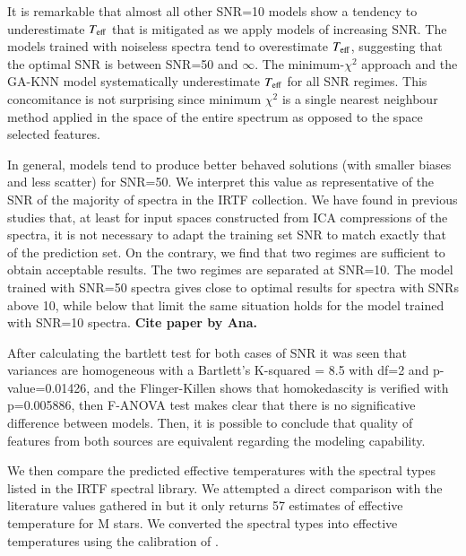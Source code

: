 It is remarkable that almost all other SNR=10 models show a tendency
to underestimate $T_{\rm eff}$ that is mitigated as we apply models of
increasing SNR. The models trained with noiseless spectra tend to
overestimate $T_{\rm eff}$, suggesting that the optimal SNR is between
SNR=50 and $\infty$. The minimum-$\chi^2$ approach and the GA-KNN
model systematically underestimate $T_{\rm eff}$ for all SNR
regimes. This concomitance is not surprising since minimum $\chi^2$ is
a single nearest neighbour method applied in the space of the entire
spectrum as opposed to the space selected features.

In general, models tend to produce better behaved solutions (with
smaller biases and less scatter) for SNR=50. We interpret this value
as representative of the SNR of the majority of spectra in the IRTF
collection. We have found in previous studies that, at least for input
spaces constructed from ICA compressions of the spectra, it is not
necessary to adapt the training set SNR to match exactly that of the
prediction set. On the contrary, we find that two regimes are
sufficient to obtain acceptable results. The two regimes are separated
at SNR=10. The model trained with SNR=50 spectra gives close to
optimal results for spectra with SNRs above 10, while below that limit
the same situation holds for the model trained with SNR=10
spectra. {\bf Cite paper by Ana.}

After calculating the bartlett test for both cases of SNR it was seen
that variances are homogeneous with a Bartlett\textquoteright s
K-squared = 8.5 with df=2 and p-value=0.01426, and the Flinger-Killen
shows that homokedascity is verified with p=0.005886, then F-ANOVA
test makes clear that there is no significative difference between
models. Then, it is possible to conclude that quality of features from
both sources are equivalent regarding the modeling capability.



We then compare the predicted effective temperatures with the spectral
types listed in the IRTF spectral library. We attempted a direct
comparison with the literature values gathered in \cite{cesetti} but
it only returns 57 
estimates of effective temperature for M stars. We converted the
spectral types into effective temperatures using the calibration
of \cite{2009ApJ...702..154S}.


